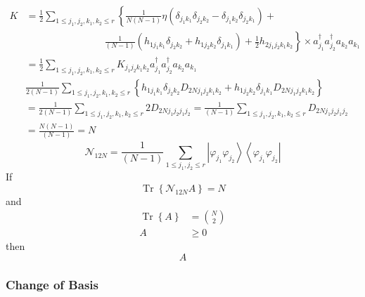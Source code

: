 \documentclass[aps,preprint]{revtex4}%
\begin{document}
\begin{align}
K  &  =\frac{1}{2}\sum_{1\leq j_{1},j_{2},k_{1},k_{2}\leq r}\left\{  \frac
{1}{N\left(  N-1\right)  }\eta\left(  \delta_{j_{1}k_{1}}\delta_{j_{2}k_{2}%
}-\delta_{j_{1}k_{2}}\delta_{j_{2}k_{1}}\right)  \right.  +\nonumber\\
&  \qquad\qquad\qquad\qquad\left.  \frac{1}{\left(  N-1\right)  }\left(
h_{1j_{1}k_{1}}\delta_{j_{2}k_{2}}+h_{1j_{2}k_{2}}\delta_{j_{1}k_{1}}\right)
+\frac{1}{2}h_{2j_{1}j_{2}k_{1}k_{2}}\right\}  \times a_{j_{1}}^{\dagger
}a_{j_{2}}^{\dagger}a_{k_{2}}a_{k_{1}}\nonumber\\
&  =\frac{1}{2}\sum_{1\leq j_{1},j_{2},k_{1},k_{2}\leq r}K_{j_{1}j_{2}%
k_{1}k_{2}}a_{j_{1}}^{\dagger}a_{j_{2}}^{\dagger}a_{k_{2}}a_{k_{1}}%
\end{align}%
\begin{align}
&  \frac{1}{2\left(  N-1\right)  }\sum_{1\leq j_{1},j_{2},k_{1},k_{2}\leq
r}\left\{  h_{1j_{1}k_{1}}\delta_{j_{2}k_{2}}D_{2Nj_{1}j_{2}k_{1}k_{2}%
}+h_{1j_{2}k_{2}}\delta_{j_{1}k_{1}}D_{2Nj_{1}j_{2}k_{1}k_{2}}\right\}
\nonumber\\
&  =\frac{1}{2\left(  N-1\right)  }\sum_{1\leq j_{1},j_{2},k_{1},k_{2}\leq
r}2D_{2Nj_{1}j_{2}j_{1}j_{2}}=\frac{1}{\left(  N-1\right)  }\sum_{1\leq
j_{1},j_{2},k_{1},k_{2}\leq r}D_{2Nj_{1}j_{2}j_{1}j_{2}}\nonumber\\
&  =\frac{N\left(  N-1\right)  }{\left(  N-1\right)  }=N
\end{align}%
\begin{equation}
\mathcal{N}_{12N}=\frac{1}{\left(  N-1\right)  }\sum_{1\leq j_{1},j_{2}\leq
r}\left\vert \varphi_{j_{1}}\varphi_{j_{2}}\right\rangle \left\langle
\varphi_{j_{1}}\varphi_{j_{2}}\right\vert
\end{equation}
If
\begin{equation}
\operatorname{Tr}\left\{  \mathcal{N}_{12N}A\right\}  =N
\end{equation}
and
\begin{align}
\operatorname{Tr}\left\{  A\right\}   &  =\binom{N}{2}\\
A  &  \geq0
\end{align}
then
\begin{equation}
A
\end{equation}


\subsubsection{Change of Basis}%
\end{document}
